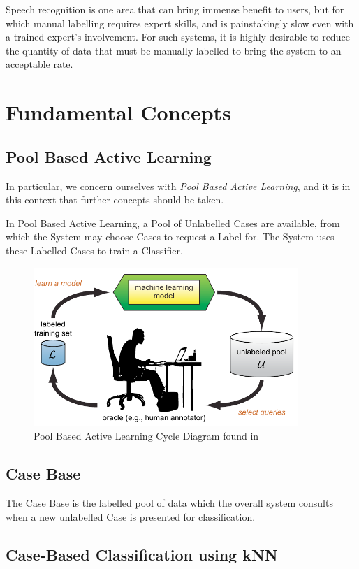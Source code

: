 \documentclass[a4paper,11pt]{report}
\begin{document}
Speech recognition is one area that can bring immense benefit to users, but for which manual labelling requires expert skills, and is painstakingly slow even with a trained expert's involvement. For such systems, it is highly desirable to reduce the quantity of data that must be manually labelled to bring the system to an acceptable rate.

\section{Fundamental Concepts}
\subsection{Pool Based Active Learning}
In particular, we concern ourselves with \emph{Pool Based Active Learning}, and it is in this context that further concepts should be taken.

In Pool Based Active Learning, a Pool of Unlabelled Cases are available, from which the System may choose Cases to request a Label for. The System uses these Labelled Cases to train a Classifier.

\begin{figure}[h!]
\includegraphics[width=10cm]{./Others/Settles2010PoolBasedImage}
\caption{Pool Based Active Learning Cycle Diagram found in \citet{Settles2010}}
\end{figure}

\subsection{Case Base}
The Case Base is the labelled pool of data which the overall system consults when a new unlabelled Case is presented for classification.

\subsection{Case-Based Classification using kNN}
\end{document}
